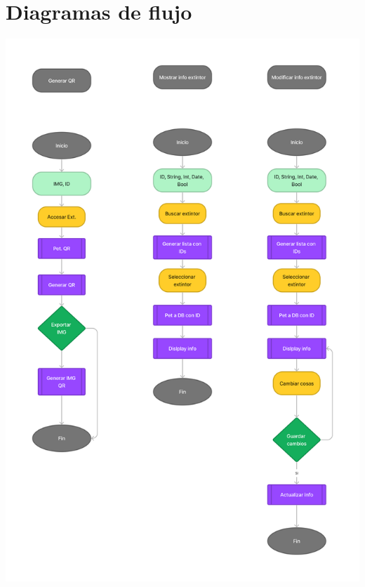 \documentclass[a4paper,twoside,10pt]{report}
\begin{document}
\section{Diagramas de flujo}


\includegraphics[width=1.0\textwidth]{GamingDiagrama1.png}
\end{document}

